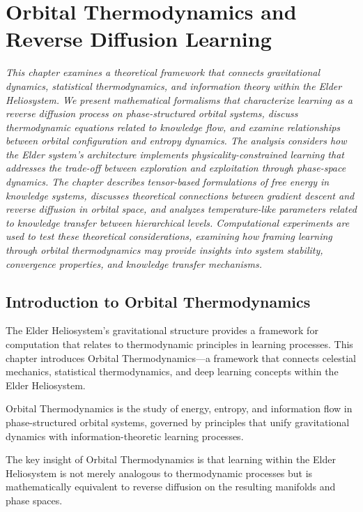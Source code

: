 \chapter{Orbital Thermodynamics and Reverse Diffusion Learning}

\textit{This chapter examines a theoretical framework that connects gravitational dynamics, statistical thermodynamics, and information theory within the Elder Heliosystem. We present mathematical formalisms that characterize learning as a reverse diffusion process on phase-structured orbital systems, discuss thermodynamic equations related to knowledge flow, and examine relationships between orbital configuration and entropy dynamics. The analysis considers how the Elder system's architecture implements physicality-constrained learning that addresses the trade-off between exploration and exploitation through phase-space dynamics. The chapter describes tensor-based formulations of free energy in knowledge systems, discusses theoretical connections between gradient descent and reverse diffusion in orbital space, and analyzes temperature-like parameters related to knowledge transfer between hierarchical levels. Computational experiments are used to test these theoretical considerations, examining how framing learning through orbital thermodynamics may provide insights into system stability, convergence properties, and knowledge transfer mechanisms.}

\section{Introduction to Orbital Thermodynamics}

The Elder Heliosystem's gravitational structure provides a framework for computation that relates to thermodynamic principles in learning processes. This chapter introduces Orbital Thermodynamics—a framework that connects celestial mechanics, statistical thermodynamics, and deep learning concepts within the Elder Heliosystem.

\begin{definition}
Orbital Thermodynamics is the study of energy, entropy, and information flow in phase-structured orbital systems, governed by principles that unify gravitational dynamics with information-theoretic learning processes.
\end{definition}

The key insight of Orbital Thermodynamics is that learning within the Elder Heliosystem is not merely analogous to thermodynamic processes but is mathematically equivalent to reverse diffusion on the resulting manifolds and phase spaces.

